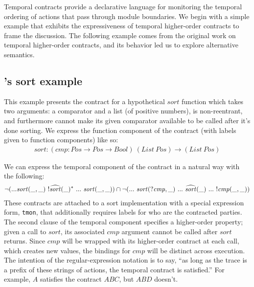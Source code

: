 Temporal contracts provide a declarative language for monitoring the temporal ordering of actions that pass through module boundaries.
%
We begin with a simple example that exhibits the expressiveness of temporal higher-order contracts to frame the discussion.
%
The following example comes from the original work on temporal higher-order contracts, and its behavior led us to explore alternative semantics.
%
\newcommand{\sortid}{\mathit{sort}}
\subsection{\dfm's sort example} \label{sec:sort}
%
This example presents the contract for a hypothetical $\sortid$ function which takes two arguments: a comparator and a list (of positive numbers), is non-reentrant, and furthermore cannot make its given comparator available to be called after it's done sorting.
%
We express the function component of the contract (with labels given to function components) like so:
\begin{align*}
  \sortid : (\mathit{cmp} : \mathit{Pos} \to \mathit{Pos} \to \mathit{Bool})\ (List\ Pos) \to (List\ Pos)
\end{align*}

We can express the temporal component of the contract in a natural way with the following:
\renewcommand*{\arraystretch}{1.2}
\newcommand*{\call}[1]{\scallev{#1}{\_}}
\newcommand*{\ret}[1]{\sretev{#1}{\_}}
\begin{align*}
 \stnot{(\sddd \sortid(\_,\_)~ \stmany{\snonevent{\retof{\sortid}(\_)}}~ \sddd~ \sortid(\_,\_))}
 \cap \stnot{(\sddd~ \sortid(?\mathit{cmp}, \_)~ \sddd~ \retof{\sortid}(\_)~ \sddd~ \snonevent{\mathit{cmp}(\_,\_)})}
\end{align*}
%
These contracts are attached to a sort implementation with a special expression form, {\tt tmon}, that additionally requires labels for who are the contracted parties.
%
The second clause of the temporal component specifies a higher-order property; given a call to $\sortid$, its associated $\mathit{cmp}$ argument cannot be called after $\sortid$ returns.
%
Since $\mathit{cmp}$ will be wrapped with its higher-order contract at each call, which creates new values, the bindings for $\mathit{cmp}$ will be distinct across execution.
%
The intention of the regular-expression notation is to say, ``as long as the trace is a prefix of these strings of actions, the temporal contract is satisfied.''
%
For example, $A$ satisfies the contract $ABC$, but $ABD$ doesn't.

